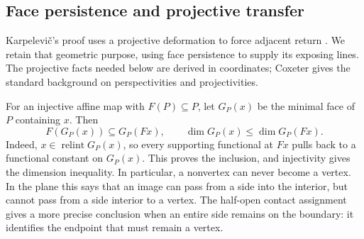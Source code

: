\documentclass[11pt,a4paper]{article}
\DeclareMathOperator{\relint}{relint}
\theoremstyle{definition}
\theoremstyle{remark}
\numberwithin{equation}{section}
\begin{document}

\subsection{Face persistence and projective transfer}

Karpelevi\v{c}'s proof uses a projective deformation to force adjacent
return \cite{Karp}. We retain that geometric purpose, using face
persistence to supply its exposing lines. The projective facts needed
below are derived in coordinates; Coxeter \cite{Coxeter} gives the
standard background on perspectivities and projectivities.

For an injective affine map with $F(P)\subseteq P$, let $G_P(x)$ be
the minimal face of $P$ containing $x$.  Then
\[
 F(G_P(x))\subseteq G_P(Fx),\qquad
 \dim G_P(x)\le\dim G_P(Fx).
\]
Indeed, $x\in\relint G_P(x)$, so every supporting functional at $Fx$
pulls back to a functional constant on $G_P(x)$.  This proves the
inclusion, and injectivity gives the dimension inequality.  In particular,
a nonvertex can never become a vertex.  In the plane this says that an
image can pass from a side into the interior, but cannot pass from a side
interior to a vertex.  The half-open contact assignment gives a more
precise conclusion when an entire side remains on the boundary: it
identifies the endpoint that must remain a vertex.
\end{document}
